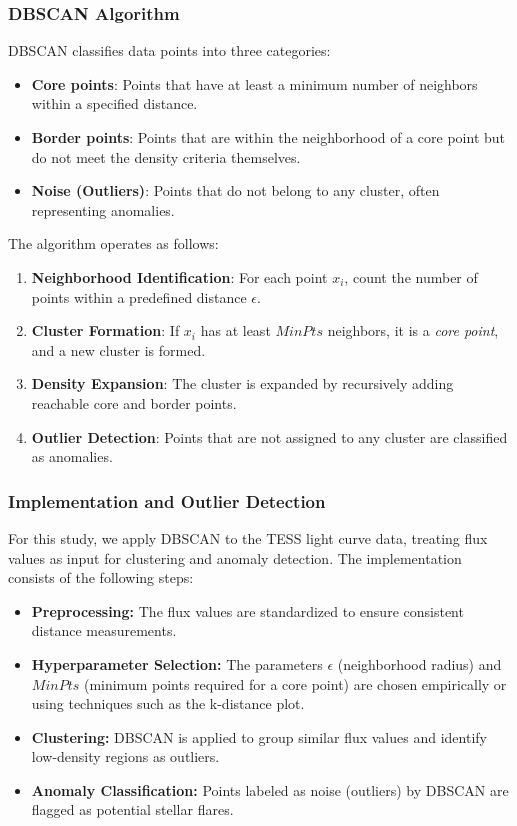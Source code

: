 \documentclass[
]{article}
\begin{document}
\subsubsection{DBSCAN Algorithm}

DBSCAN classifies data points into three categories:

\begin{itemize}
    \item \textbf{Core points}: Points that have at least a minimum number of neighbors within a specified distance.
    \item \textbf{Border points}: Points that are within the neighborhood of a core point but do not meet the density criteria themselves.
    \item \textbf{Noise (Outliers)}: Points that do not belong to any cluster, often representing anomalies.
\end{itemize}

The algorithm operates as follows:

\begin{enumerate}
    \item \textbf{Neighborhood Identification}: For each point $x_i$, count the number of points within a predefined distance $\epsilon$.
    \item \textbf{Cluster Formation}: If $x_i$ has at least $MinPts$ neighbors, it is a \textit{core point}, and a new cluster is formed.
    \item \textbf{Density Expansion}: The cluster is expanded by recursively adding reachable core and border points.
    \item \textbf{Outlier Detection}: Points that are not assigned to any cluster are classified as anomalies.
\end{enumerate}

\subsubsection{Implementation and Outlier Detection}

For this study, we apply DBSCAN to the TESS light curve data, treating flux values as input for clustering and anomaly detection. The implementation consists of the following steps:

\begin{itemize}
    \item \textbf{Preprocessing:} The flux values are standardized to ensure consistent distance measurements.
    \item \textbf{Hyperparameter Selection:} The parameters $\epsilon$ (neighborhood radius) and $MinPts$ (minimum points required for a core point) are chosen empirically or using techniques such as the k-distance plot.
    \item \textbf{Clustering:} DBSCAN is applied to group similar flux values and identify low-density regions as outliers.
    \item \textbf{Anomaly Classification:} Points labeled as noise (outliers) by DBSCAN are flagged as potential stellar flares.
\end{itemize}
\end{document}
